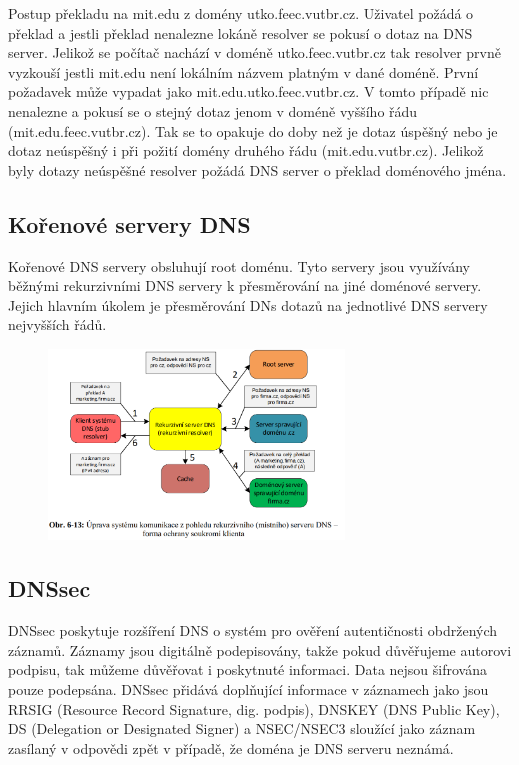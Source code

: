 Postup překladu na mit.edu z domény utko.feec.vutbr.cz.
Uživatel požádá o překlad a jestli překlad nenalezne lokáně resolver se pokusí o dotaz na DNS server.
Jelikož se počítač nachází v doméně utko.feec.vutbr.cz tak resolver prvně vyzkouší jestli mit.edu není lokálním názvem platným v dané doméně.
První požadavek může vypadat jako mit.edu.utko.feec.vutbr.cz.
V tomto případě nic nenalezne a pokusí se o stejný dotaz jenom v doméně vyššího řádu (mit.edu.feec.vutbr.cz).
Tak se to opakuje do doby než je dotaz úspěšný nebo je dotaz neúspěšný i při požití domény druhého řádu (mit.edu.vutbr.cz).
Jelikož byly dotazy neúspěšné resolver požádá DNS server o překlad doménového jména.

\subsection{Kořenové servery DNS}

Kořenové DNS servery obsluhují root doménu.
Tyto servery jsou využívány běžnými rekurzivními DNS servery k přesměrování na jiné doménové servery.
Jejich hlavním úkolem je přesměrování DNs dotazů na jednotlivé DNS servery nejvyšších řádů.

\begin{figure}[!h]
    \centering
    \includegraphics[width=0.7\textwidth]{obrazky/040.png}
\end{figure}

\subsection{DNSsec}

DNSsec poskytuje rozšíření DNS o systém pro ověření autentičnosti obdržených záznamů.
Záznamy jsou digitálně podepisovány, takže pokud důvěřujeme autorovi podpisu, tak můžeme důvěřovat i poskytnuté informaci.
Data nejsou šifrována pouze podepsána.
DNSsec přidává doplňující informace v záznamech jako jsou RRSIG (Resource Record Signature, dig. podpis), DNSKEY (DNS Public Key), DS (Delegation or Designated Signer) a NSEC/NSEC3 sloužící jako záznam zasílaný v odpovědi zpět v případě, že doména je DNS serveru neznámá.





